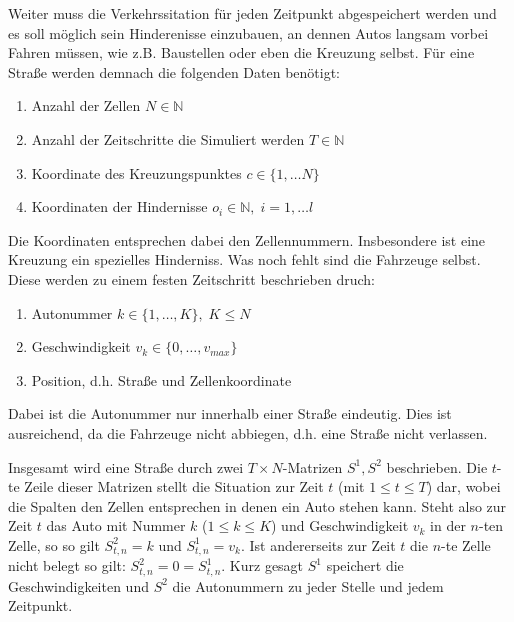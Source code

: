 Weiter muss die Verkehrssitation für jeden Zeitpunkt abgespeichert werden und
es soll möglich sein Hinderenisse einzubauen, an dennen Autos langsam vorbei Fahren müssen, 
wie z.B. Baustellen oder eben die Kreuzung selbst. 
Für eine Straße werden demnach die folgenden Daten benötigt:
\begin{enumerate}
  \item Anzahl der Zellen \(N \in \mathbb{N}\)
  \item Anzahl der Zeitschritte die Simuliert werden \(T \in \mathbb{N}\)
  \item Koordinate des Kreuzungspunktes \(c \in \{ 1, \ldots N \}\)
  \item Koordinaten der Hindernisse \(o_i \in \mathbb{N}, \; i = 1, \ldots l\)
\end{enumerate}
Die Koordinaten entsprechen dabei den Zellennummern. Insbesondere ist eine Kreuzung ein spezielles Hinderniss. 
Was noch fehlt sind die Fahrzeuge selbst. Diese werden zu einem festen Zeitschritt beschrieben druch:
\begin{enumerate}
  \item Autonummer \(k \in \{ 1, \ldots, K \}, \; K \leq N\) 
  \item Geschwindigkeit \(v_k \in \{0, \ldots, v_{max} \}\)
  \item Position, d.h. Straße und Zellenkoordinate
\end{enumerate}
Dabei ist die Autonummer nur innerhalb einer Straße eindeutig. Dies ist ausreichend, da die Fahrzeuge nicht 
abbiegen, d.h. eine Straße nicht verlassen.

Insgesamt wird eine Straße durch zwei \(T \times N\)-Matrizen \(S^1, S^{2}\) beschrieben.
Die \(t\)-te Zeile dieser Matrizen stellt die Situation zur Zeit \(t\) (mit \(1 \leq t \leq T\)) dar, 
wobei die Spalten den Zellen entsprechen in denen ein Auto stehen kann. 
Steht also zur Zeit \(t\) das Auto mit Nummer \(k\) (\(1 \leq k \leq K\)) und Geschwindigkeit \(v_k\) in der \(n\)-ten Zelle, 
so so gilt \( S^{2}_{t, n} = k\) und \(S^{1}_{t, n} = v_k\). 
Ist andererseits zur Zeit \(t\) die \(n\)-te Zelle nicht belegt so gilt: \(S^2_{t, n} = 0 = S^1_{t, n}\).
Kurz gesagt \(S^{1}\) speichert die Geschwindigkeiten und \(S^{2}\) die Autonummern zu jeder Stelle und jedem Zeitpunkt.
